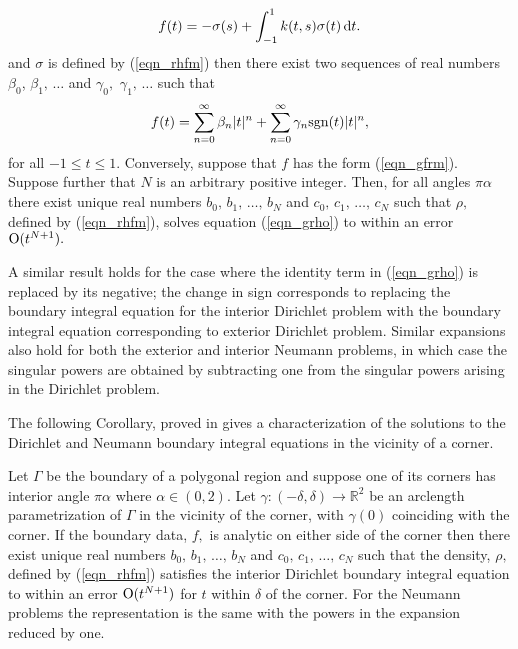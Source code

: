 \begin{theorem}
\begin{align}
f(t) = -\sigma(s) +\int_{-1}^1 k(t,s)  \sigma(t)\,{\rm d}t.
\label{eqn_grho}
\end{align}
and $\sigma$ is defined by (\ref{eqn_rhfm}) then there exist two sequences of real numbers $\beta_0$, $\beta_1,\,\dots$ and $\gamma_0,$ $\gamma_1,\,\dots$ such that
\begin{align}
f(t) = \sum_{n=0}^\infty\beta_n |t|^n + \sum_{n=0}^\infty \gamma_n {\rm sgn}(t) |t|^n,
\label{eqn_gfrm}
\end{align}
for all $-1 \le t \le 1.$ Conversely, suppose that $f$ has the form (\ref{eqn_gfrm}). Suppose further that $N$ is an arbitrary positive integer. Then, for all angles $\pi \alpha$ there exist unique real numbers $b_0,\,b_1,\,\dots,\,b_N$ and $c_0,\,c_1,\,\dots,\,c_N$ such that $\rho,$ defined by (\ref{eqn_rhfm}), solves equation  (\ref{eqn_grho}) to within an error ${\rm O}(t^{N+1}).$ 
\end{theorem}

\begin{remark1}
A similar result holds for the case where the identity term in (\ref{eqn_grho}) is replaced by its negative; the change in sign corresponds to replacing the boundary integral equation for the interior Dirichlet problem with the boundary integral equation corresponding to exterior Dirichlet problem. Similar expansions also hold for both the exterior and interior Neumann problems, in which case the singular powers are obtained by subtracting one from the singular powers arising in the Dirichlet problem.
\end{remark1}


The following Corollary, proved in \cite{serkhacha} gives a characterization of the solutions to the Dirichlet and Neumann boundary integral equations in the vicinity of a corner.

\begin{corollary}
Let $\Gamma$ be the boundary of a polygonal region and suppose one of its corners has interior angle $\pi \alpha$ where $\alpha \in (0,2).$ Let $\gamma:(-\delta,\delta) \rightarrow \mathbb{R}^2$ be an arclength parametrization of $\Gamma$ in the vicinity of the corner, with $\gamma(0)$ coinciding with the corner. If the boundary data, $f,$ is analytic on either side of the corner then there exist unique real numbers $b_0,\,b_1,\,\dots,\,b_N$ and $c_0,\,c_1,\,\dots,\,c_N$ such that the density, $\rho,$ defined by (\ref{eqn_rhfm}) satisfies the interior Dirichlet boundary integral equation to within an error ${\rm O}(t^{N+1})$ for $t$ within $\delta$ of the corner. For the Neumann problems the representation is the same with the powers in the expansion reduced by one.
\end{corollary}
